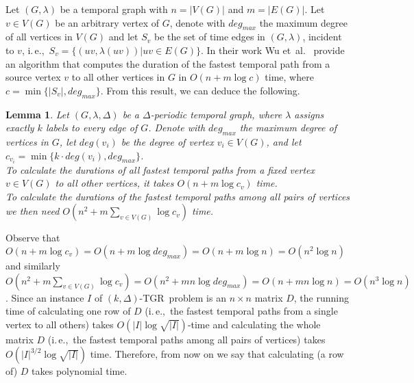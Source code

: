 \documentclass[11pt,a4paper]{article}
\newtheorem{lemma}[theorem]{Lemma}
\theoremstyle{remark}
\theoremstyle{definition}
\newtheorem{definition}[theorem]{Definition}
\newcommand{\ie}{i.\,e.,\ }
\newcommand{\kDeltaExact}{\textsc{$(k,\Delta)$-TGR}}
\begin{document}
\begin{comment}
\begin{definition}[$D$-increasing temporal path]
Let $(G,\lambda,\Delta)$ be a $\Delta$-periodic temporal graph on $n$ vertices, and let $D$ be an $n\times n $ matrix of positive integers. 
Let $P$ be a temporal path from $u_0$ to $u_k$ on the vertices $u_0,u_1,\ldots,u_k$, and let $P^\textsc{ST}=(u_0,u_1,\ldots,u_k)$ be the underlying \emph{static} path in $G$.
Then $P$ is \emph{$D$-increasing} in $G$ if $0=D_{u_0,u_0}<D_{u_0,u_1}<D_{u_0,u_2}< \ldots < D_{u_0,u_k}$.
\end{definition}
\end{comment}

Let $(G,\lambda)$ be a temporal graph with  $n = |V(G)|$ and  $m=|E(G)|$.
Let $v \in V(G)$ be an arbitrary vertex of $G$, denote with $deg_{max}$ the maximum degree of all vertices in $V(G)$ and let $S_v$ be the set of time edges in $(G,\lambda)$, incident to $v$, \ie $S_v = \{(uv, \lambda(uv)) | uv \in E(G)\}$.
In their work Wu et~al.~\cite{Wu2016Efficient} provide an algorithm that computes the duration of the fastest temporal path from a source vertex $v$ to all other vertices in $G$ in
$O(n + m \log c)$ time, where $c = \min \{|S_v|, deg_{max}\}$.
From this result, we can deduce the following. 
\begin{lemma} \label{lemma:calculatingD}
Let $(G, \lambda, \Delta)$ be a $\Delta$-periodic temporal graph, where $\lambda$ assigns exactly $k$ labels to every edge of $G$. 
Denote with $deg_{max}$ the maximum degree of vertices in $G$, let $deg(v_i)$ be the degree of vertex $v_i \in V(G)$,
and let $c_{v_i} = \min \{ k \cdot deg(v_i), deg_{max}\}$.\\
To calculate the durations of all fastest temporal paths from a fixed vertex $v \in V(G)$ to all other vertices, it takes $O(n + m \log c_v)$ time. \\
To calculate the durations of the fastest temporal paths among all pairs of vertices we then need $O(n^2 + m \sum_{v \in V(G)} \log c_v)$ time.
\end{lemma}

Observe that $O(n + m \log c_v) = O(n + m \log deg_{max}) = O(n + m \log n) = O(n^2 \log n)$ and similarly
$O(n^2 + m \sum_{v \in V(G)} \log c_v) = O(n^2 + mn \log deg_{max}) = O(n + mn \log n) = O(n^3 \log n)$.
Since an instance $I$ of \kDeltaExact\ problem is an $n \times n$ matrix $D$, the running time of calculating one row of $D$ (\ie the fastest temporal paths from a single vertex to all others) takes $O(|I|\log \sqrt{|I|})$-time and calculating the whole matrix $D$ (\ie the fastest temporal paths among all pairs of vertices) takes $O(|I|^{3/2} \log \sqrt{|I|})$ time.
Therefore, from now on we say that calculating (a row of) $D$ takes polynomial time.
\end{document}
